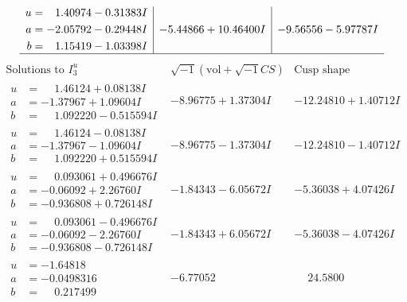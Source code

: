 \documentclass[1p]{elsarticle_modified}
\theoremstyle{definition}
\newcommand{\I}{\sqrt{-1}}
\begin{document}
$$\begin{array}{c|c|c}
\begin{aligned}
u &= \phantom{-}1.40974 - 0.31383 I \\
a &= -2.05792 - 0.29448 I \\
b &= \phantom{-}1.15419 - 1.03398 I\end{aligned}
 & -5.44866 + 10.46400 I & -9.56556 - 5.97787 I\\
 \hline 
 \end{array}$$\newpage$$\begin{array}{c|c|c}  
\text{Solutions to }I^u_{3}& \I (\text{vol} + \sqrt{-1}CS) & \text{Cusp shape}\\
 \hline 
\begin{aligned}
u &= \phantom{-}1.46124 + 0.08138 I \\
a &= -1.37967 + 1.09604 I \\
b &= \phantom{-}1.092220 - 0.515594 I\end{aligned}
 & -8.96775 + 1.37304 I & -12.24810 + 1.40712 I \\ \hline\begin{aligned}
u &= \phantom{-}1.46124 - 0.08138 I \\
a &= -1.37967 - 1.09604 I \\
b &= \phantom{-}1.092220 + 0.515594 I\end{aligned}
 & -8.96775 - 1.37304 I & -12.24810 - 1.40712 I \\ \hline\begin{aligned}
u &= \phantom{-}0.093061 + 0.496676 I \\
a &= -0.06092 + 2.26760 I \\
b &= -0.936808 + 0.726148 I\end{aligned}
 & -1.84343 - 6.05672 I & -5.36038 + 4.07426 I \\ \hline\begin{aligned}
u &= \phantom{-}0.093061 - 0.496676 I \\
a &= -0.06092 - 2.26760 I \\
b &= -0.936808 - 0.726148 I\end{aligned}
 & -1.84343 + 6.05672 I & -5.36038 - 4.07426 I \\ \hline\begin{aligned}
u &= -1.64818\phantom{ +0.000000I} \\
a &= -0.0498316\phantom{ +0.000000I} \\
b &= \phantom{-}0.217499\phantom{ +0.000000I}\end{aligned}
 & -6.77052\phantom{ +0.000000I} & \phantom{-}24.5800\phantom{ +0.000000I} \\ \hline\begin{aligned}

\end{aligned}
\end{array}$$
\end{document}
